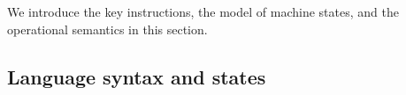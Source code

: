 We introduce the key \sparc{} instructions, the model of machine
states, and the operational semantics in this section.

\subsection{Language syntax and states}
\label{subsec:syntax}
		
		
		
		
		
		
		
		
